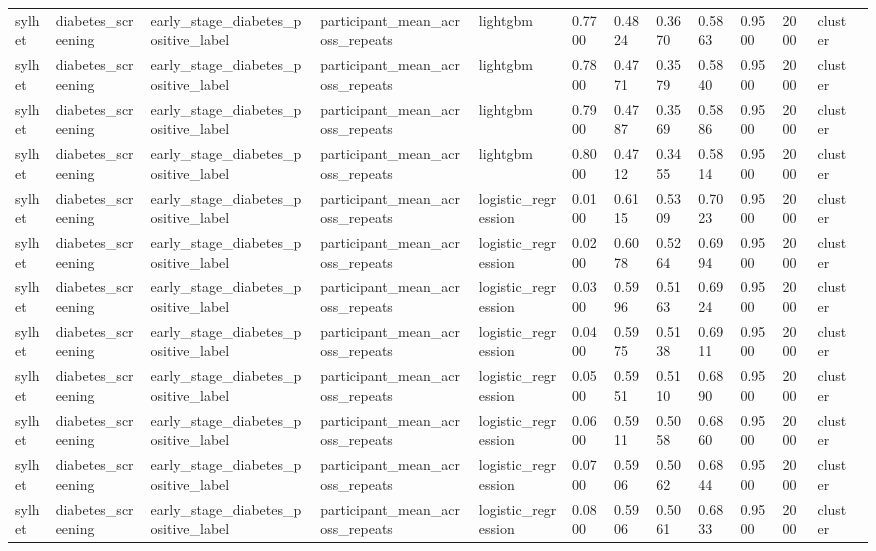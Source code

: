 \begin{tabular}{lllllllllllll}
sylhet & diabetes\_screening & early\_stage\_diabetes\_positive\_label & participant\_mean\_across\_repeats & lightgbm & 0.7700 & 0.4824 & 0.3670 & 0.5863 & 0.9500 & 2000 & cluster &  \\
sylhet & diabetes\_screening & early\_stage\_diabetes\_positive\_label & participant\_mean\_across\_repeats & lightgbm & 0.7800 & 0.4771 & 0.3579 & 0.5840 & 0.9500 & 2000 & cluster &  \\
sylhet & diabetes\_screening & early\_stage\_diabetes\_positive\_label & participant\_mean\_across\_repeats & lightgbm & 0.7900 & 0.4787 & 0.3569 & 0.5886 & 0.9500 & 2000 & cluster &  \\
sylhet & diabetes\_screening & early\_stage\_diabetes\_positive\_label & participant\_mean\_across\_repeats & lightgbm & 0.8000 & 0.4712 & 0.3455 & 0.5814 & 0.9500 & 2000 & cluster &  \\
sylhet & diabetes\_screening & early\_stage\_diabetes\_positive\_label & participant\_mean\_across\_repeats & logistic\_regression & 0.0100 & 0.6115 & 0.5309 & 0.7023 & 0.9500 & 2000 & cluster &  \\
sylhet & diabetes\_screening & early\_stage\_diabetes\_positive\_label & participant\_mean\_across\_repeats & logistic\_regression & 0.0200 & 0.6078 & 0.5264 & 0.6994 & 0.9500 & 2000 & cluster &  \\
sylhet & diabetes\_screening & early\_stage\_diabetes\_positive\_label & participant\_mean\_across\_repeats & logistic\_regression & 0.0300 & 0.5996 & 0.5163 & 0.6924 & 0.9500 & 2000 & cluster &  \\
sylhet & diabetes\_screening & early\_stage\_diabetes\_positive\_label & participant\_mean\_across\_repeats & logistic\_regression & 0.0400 & 0.5975 & 0.5138 & 0.6911 & 0.9500 & 2000 & cluster &  \\
sylhet & diabetes\_screening & early\_stage\_diabetes\_positive\_label & participant\_mean\_across\_repeats & logistic\_regression & 0.0500 & 0.5951 & 0.5110 & 0.6890 & 0.9500 & 2000 & cluster &  \\
sylhet & diabetes\_screening & early\_stage\_diabetes\_positive\_label & participant\_mean\_across\_repeats & logistic\_regression & 0.0600 & 0.5911 & 0.5058 & 0.6860 & 0.9500 & 2000 & cluster &  \\
sylhet & diabetes\_screening & early\_stage\_diabetes\_positive\_label & participant\_mean\_across\_repeats & logistic\_regression & 0.0700 & 0.5906 & 0.5062 & 0.6844 & 0.9500 & 2000 & cluster &  \\
sylhet & diabetes\_screening & early\_stage\_diabetes\_positive\_label & participant\_mean\_across\_repeats & logistic\_regression & 0.0800 & 0.5906 & 0.5061 & 0.6833 & 0.9500 & 2000 & cluster &  \\

\end{tabular}
